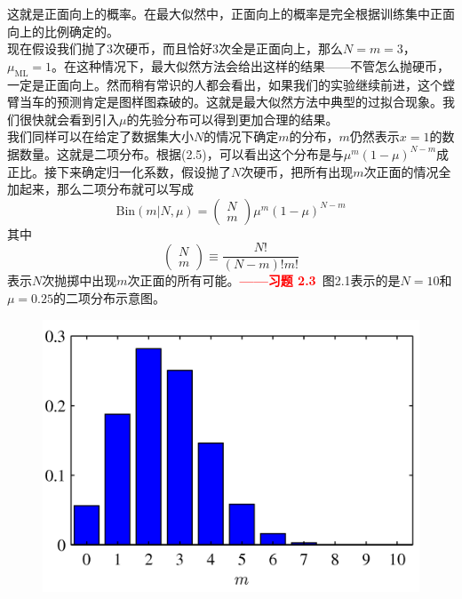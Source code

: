 \documentclass[b5paper]{book}
\numberwithin{equation}{chapter}
\begin{document}
{\begin{equation}
	\end{equation}
	这就是正面向上的概率。在最大似然中，正面向上的概率是完全根据训练集中正面向上的比例确定的。\\
	\indent 现在假设我们抛了3次硬币，而且恰好3次全是正面向上，那么$N=m=3$，$\mu_{\mathrm{ML}}=1$。在这种情况下，最大似然方法会给出这样的结果——不管怎么抛硬币，一定是正面向上。然而稍有常识的人都会看出，如果我们的实验继续前进，这个螳臂当车的预测肯定是图样图森破的。这就是最大似然方法中典型的过拟合现象。我们很快就会看到引入$\mu$的先验分布可以得到更加合理的结果。\\
	\indent 我们同样可以在给定了数据集大小$N$的情况下确定$m$的分布，$m$仍然表示$x=1$的数据数量。这就是二项分布。根据(2.5)，可以看出这个分布是与$\mu^m (1-\mu)^{N-m}$成正比。接下来确定归一化系数，假设抛了$N$次硬币，把所有出现$m$次正面的情况全加起来，那么二项分布就可以写成
	\begin{equation}
		\mathrm{Bin}(m|N,\mu)=\left(\begin{matrix} N \\ m \end{matrix} \right) \mu^m(1-\mu)^{N-m}
	\end{equation}
	其中
	\begin{equation}
		\left( \begin{matrix} N \\ m \end{matrix} \right) \equiv \frac{N!}{(N-m)!m!}
	\end{equation}
	表示$N$次抛掷中出现$m$次正面的所有可能。\textcolor{red}{\textbf{——习题 2.3}\ }图2.1表示的是$N=10$和$\mu=0.25$的二项分布示意图。
	\begin{figure}[ht]
		\centering
		\includegraphics[scale=0.8]{Images/2-1.png}

\end{figure}}
\end{document}
